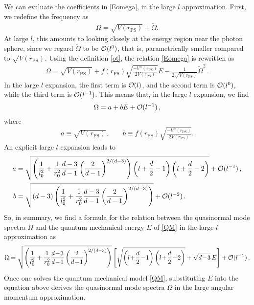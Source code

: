 \documentclass[a4paper,11pt]{article}
\begin{document}
We can evaluate the coefficients in \eqref{Eomega}, in the large $l$ approximation. First, we redefine the frequency as
\begin{align}
    \Omega = \sqrt{V(r_\mathrm{PS})} + \widetilde{\Omega}.
    \label{ot}
\end{align}
At large $l$, this amounts to looking closely at the energy region near the photon sphere, since 
we regard $\widetilde{\Omega}$ to be
${\cal O}(l^0)$, that is, parametrically smaller compared to $\sqrt{V(r_\mathrm{PS})}$.
Using the definition \eqref{ot}, the relation \eqref{Eomega}
is rewritten as
\begin{align}
    \Omega = \sqrt{V(r_\mathrm{PS})} 
    + f(r_\mathrm{PS})\sqrt{\frac{-V''(r_\mathrm{PS}) }{2V(r_\mathrm{PS})}} E 
    - \frac{1}{2\sqrt{V(r_\mathrm{PS})}}\widetilde{\Omega}^2 \, .
\end{align}
In the large $l$ expansion, the first term is ${\cal O}(l)$, and the second term is ${\cal O}(l^0)$, while the third term is
${\cal O}(l^{-1})$. This means that, in the large $l$ expansion, we find
\begin{align}
    \Omega = a+b E 
    +  {\cal O}(l^{-1})\, ,
\end{align}
where 
\begin{align}
    a \equiv \sqrt{V(r_\mathrm{PS})} , \qquad
    b \equiv  f(r_\mathrm{PS})\sqrt{\frac{-V''(r_\mathrm{PS}) }{2V(r_\mathrm{PS})}} .
\end{align}
An explicit large $l$ expansion leads to
\begin{align}
a  
&= \sqrt{\left(\frac{1}{l_0^2} + \frac{1}{r_0^2}\frac{d-3}{d-1}\left(\frac{2}{d-1}\right)^{2/(d-3)}\right) 
\left(l+ \frac{d}{2}-1\right)\left(l+\frac{d}{2}-2\right)}+  {\cal O}(l^{-1}) \, , \\
    b
&    = \sqrt{(d-3)\left(\frac{1}{l_0^2} 
    + \frac{1}{r_0^2}\frac{d-3}{d-1}\left(\frac{2}{d-1}\right)^{2/(d-3)}\right)}+  {\cal O}(l^{-2}) \, .
\end{align}
So, in summary, we find a formula for the relation between the quasinormal mode spectra $\Omega$ and
the quantum mechanical energy $E$ of \eqref{QM} in the large $l$ approximation as
\begin{align}
    \Omega = 
    \sqrt{\left(\frac{1}{l_0^2} 
    + \frac{1}{r_0^2}\frac{d\! -\! 3}{d\! -\! 1}\left(\frac{2}{d\! -\! 1}\right)^{2/(d-3)}\right)}
    \left[\sqrt{\left(l\!+\! \frac{d}{2}\! -\! 1\right)\left(l\! +\! \frac{d}{2}\! -\! 2\right)} + \sqrt{d\!-\! 3} \, E\right]
    +  {\cal O}(l^{-1})\, .
\label{omegaE}
\end{align}
Once one solves the quantum mechanical model \eqref{QM}, substituting $E$ into the equation above derives the quasinormal mode spectra $\Omega$ in the large angular momentum approximation.
\end{document}

